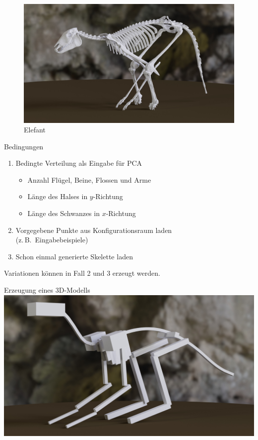 \documentclass{beamer}
\newcommand{\zb}{z.\,B.\ }
\begin{document}
\begin{frame}[focus]
 \begin{figure}
  \includegraphics[width=\textwidth]{../../java_skeleton_generation/example_skeletons/elefant.jpg}
  \caption{Elefant}
 \end{figure}
\end{frame}

\begin{frame}{Bedingungen}
 \begin{enumerate}
  \item Bedingte Verteilung als Eingabe für PCA
  \begin{itemize}
   \item Anzahl Flügel, Beine, Flossen und Arme
   \item Länge des Halses in $y$-Richtung
   \item Länge des Schwanzes in $x$-Richtung
  \end{itemize}
  \item Vorgegebene Punkte aus Konfigurationsraum laden\\ (\zb Eingabebeispiele)
  \item Schon einmal generierte Skelette laden
 \end{enumerate}
 
 \begin{block}{Variationen}
   können in Fall 2 und 3 erzeugt werden.
 \end{block}
\end{frame}

\begin{frame}{Erzeugung eines 3D-Modells}
 \centering
 \includegraphics[width=\textwidth]{../../java_skeleton_generation/example_skeletons/4legs_boxes.jpg}
\end{frame}
\end{document}
